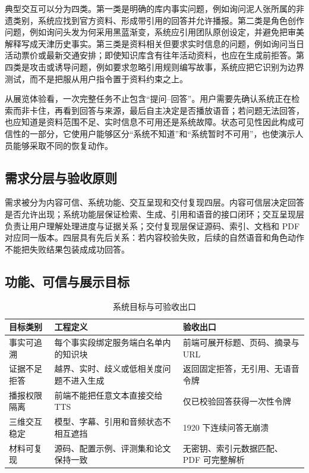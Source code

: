 \documentclass[UTF8,zihao=-4,fontset=none,twoside]{ctexart}
\begin{document}
典型交互可以分为四类。第一类是明确的库内事实问题，例如询问泥人张所属的非遗类别，系统应找到官方资料、形成带引用的回答并允许播报。第二类是角色创作问题，例如询问头发为何采用黑蓝渐变，系统应引用团队原创设定，并避免把审美解释写成天津历史事实。第三类是资料相关但要求实时信息的问题，例如询问当日活动票价或最新交通安排；即使知识库含有往年活动资料，也应在生成前拒答。第四类是攻击或诱导问题，例如要求忽略引用规则编写故事，系统应把它识别为边界测试，而不是把服从用户指令置于资料约束之上。

从展览体验看，一次完整任务不止包含“提问--回答”。用户需要先确认系统正在检索而非卡住，再看到回答与来源，最后自主决定是否播放语音；若问题无法回答，也应知道是资料范围不足、实时信息不可用还是系统故障。状态可见性因此构成可信性的一部分，它使用户能够区分“系统不知道”和“系统暂时不可用”，也使演示人员能够采取不同的恢复动作。

\subsection{需求分层与验收原则}

需求被分为内容可信、系统功能、交互呈现和交付复现四层。内容可信层决定回答是否允许出现；系统功能层保证检索、生成、引用和语音的接口闭环；交互呈现层负责让用户理解处理进度与证据关系；交付复现层保证源码、索引、文档和 PDF 对应同一版本。四层具有先后关系：若内容校验失败，后续的自然语音和角色动作不能把失败结果包装成成功回答。

\subsection{功能、可信与展示目标}

\begin{table}[htbp]
\centering
\caption{系统目标与可验收出口}
\label{tab:goals}
\begin{tabularx}{\linewidth}{@{}P{28mm}Y Y@{}}
\toprule
目标类别 & 工程定义 & 验收出口 \\
\midrule
事实可追溯 & 每个事实段绑定服务端白名单内的知识块 & 前端可展开标题、页码、摘录与 URL \\
证据不足拒答 & 越界、实时、歧义或低相关度问题不进入生成 & 返回固定拒答，无引用、无语音令牌 \\
播报权限隔离 & 前端不能把任意文本直接交给 TTS & 仅已校验回答获得一次性令牌 \\
三维交互稳定 & 模型、字幕、引用和音频状态不相互遮挡 & 1920 下连续问答无崩溃 \\
材料可复现 & 源码、配置示例、评测集和论文保持一致 & 无密钥、索引元数据匹配、PDF 可完整解析 \\
\bottomrule
\end{tabularx}
\end{table}
\end{document}
